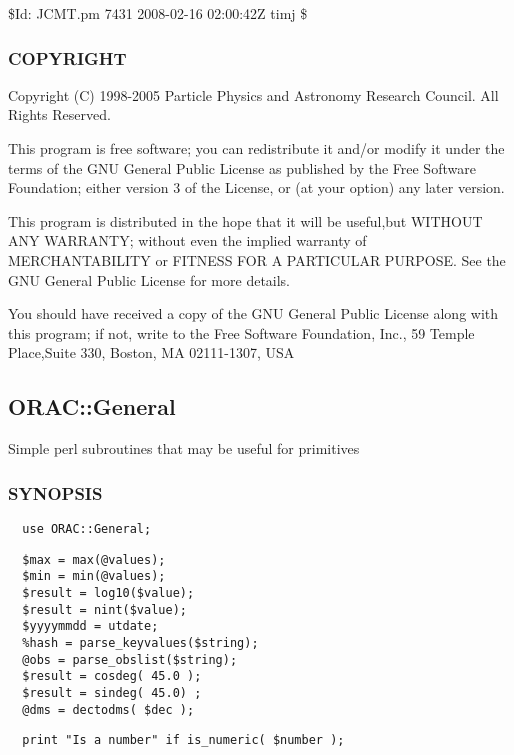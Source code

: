 \begin{description}
\$Id: JCMT.pm 7431 2008-02-16 02:00:42Z timj \$

\subsubsection*{COPYRIGHT\label{ORAC::Frame::JCMT_COPYRIGHT}}


Copyright (C) 1998-2005 Particle Physics and Astronomy Research
Council. All Rights Reserved.



This program is free software; you can redistribute it and/or modify it under
the terms of the GNU General Public License as published by the Free Software
Foundation; either version 3 of the License, or (at your option) any later
version.



This program is distributed in the hope that it will be useful,but WITHOUT ANY
WARRANTY; without even the implied warranty of MERCHANTABILITY or FITNESS FOR A
PARTICULAR PURPOSE. See the GNU General Public License for more details.



You should have received a copy of the GNU General Public License along with
this program; if not, write to the Free Software Foundation, Inc., 59 Temple
Place,Suite 330, Boston, MA  02111-1307, USA

\subsection{ORAC::General\label{ORAC::General}}


Simple perl subroutines that may be useful for primitives

\subsubsection*{SYNOPSIS\label{ORAC::General_SYNOPSIS}}
\begin{verbatim}
  use ORAC::General;
\end{verbatim}
\begin{verbatim}
  $max = max(@values);
  $min = min(@values);
  $result = log10($value);
  $result = nint($value);
  $yyyymmdd = utdate;
  %hash = parse_keyvalues($string);
  @obs = parse_obslist($string);
  $result = cosdeg( 45.0 );
  $result = sindeg( 45.0) ;
  @dms = dectodms( $dec );
\end{verbatim}
\begin{verbatim}
  print "Is a number" if is_numeric( $number );
\end{verbatim}

\end{description}
